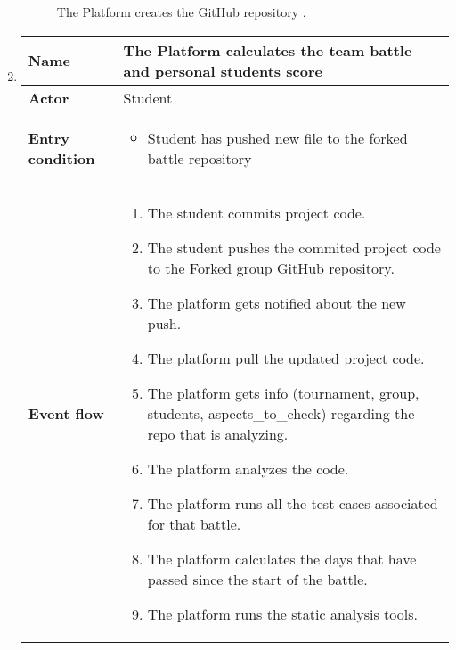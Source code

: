 \begin{enumerate}[label=\textbf{UC\arabic*}:,leftmargin=1.3cm]
          \begin{figure}[H]
              \centering
              \caption{The Platform creates the GitHub repository   .}
              \label{fig:Battle registration deadline}
          \end{figure}
          \pagebreak
    \item \textbf{}
          \begin{table}[H]
              \centering
              \begin{tabular}{|l|p{11.9cm}|}
                  \hline
                  \textbf{Name}            & The Platform calculates the team battle and personal students score                    \\\hline
                  \textbf{Actor}           & Student                                                                                \\\hline
                  \textbf{Entry condition} &
                  \begin{itemize}
                      \item Student has pushed new file to the forked battle repository
                  \end{itemize}                                                  \\\hline
                  \textbf{Event flow}      &
                  \begin{enumerate}[label=\arabic*.]
                      \item The student commits project code.
                      \item The student pushes the commited project code to the Forked group GitHub repository.
                      \item The platform gets notified about the new push.
                      \item The platform pull the updated project code.
                      \item The platform gets info (tournament, group, students, aspects_to_check) regarding the repo that is analyzing.
                      \item The platform analyzes the code.
                      \item The platform runs all the test cases associated for that battle.
                      \item The platform calculates the days that have passed since the start of the battle.
                      \item The platform runs the static analysis tools.

\end{enumerate}
\end{tabular}
\end{table}
\end{enumerate}
